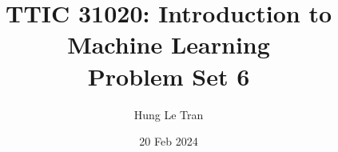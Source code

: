 \documentclass[a4paper, 10pt]{article}
\title{TTIC 31020: Introduction to Machine Learning \\ \large Problem Set 6}
\date{20 Feb 2024}
\author{Hung Le Tran}
\begin{document}
\maketitle
\setcounter{section}{6}
\begin{problem} [Problem 1]
\end{problem}
\begin{solution}
\end{solution}
\end{document}
